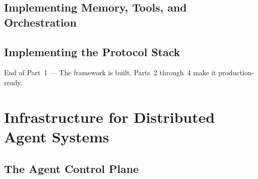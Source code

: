 \documentclass[
  11pt,
  twoside,
  openright
]{book}
\makeatletter
\renewcommand{\cleardoublepage}{%
  \clearpage
  \if@twoside
    \ifodd\c@page
    \else
      \thispagestyle{empty}%
      \hbox{}%
      \newpage
      \if@twocolumn\hbox{}\newpage\fi
    \fi
  \fi
}
\newcommand{\partclose}[1]{%
  \cleardoublepage
  \vspace*{\fill}
  \begin{center}
    \sffamily\Large\color{BookBlue}#1
  \end{center}
  \vspace*{\fill}
  \cleardoublepage
}
\makeatother
\begin{document}
\chapter{Implementing Memory, Tools, and Orchestration}
\label{ch:memory-tools-orchestration}

\chapter{Implementing the Protocol Stack}
\label{ch:protocol-stack}

\partclose{End of Part~1 --- The framework is built.
Parts~2 through~4 make it production-ready.}

\part{Infrastructure for Distributed Agent Systems}
\label{part:infrastructure}

\chapter{The Agent Control Plane}
\label{ch:control-plane}
\end{document}
